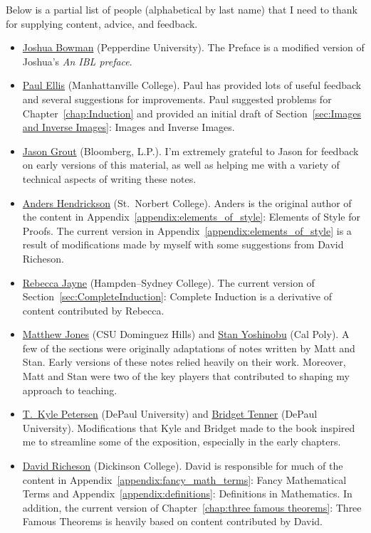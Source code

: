 \documentclass[12pt,oneside]{book}
\theoremstyle{definition}
\begin{document}
\noindent Below is a partial list of people (alphabetical by last name) that I need to thank for supplying content, advice, and feedback.
\begin{itemize}
\item \href{https://thalestriangles.blogspot.com}{Joshua Bowman} (Pepperdine University). The Preface is a modified version of Joshua's \emph{An IBL preface}.
\item \href{http://www.paulellis.org}{Paul Ellis} (Manhattanville College). Paul has provided lots of useful feedback and several suggestions for improvements. Paul suggested problems for Chapter~\ref{chap:Induction} and provided an initial draft of Section~\ref{sec:Images and Inverse Images}: Images and Inverse Images.
\item \href{http://jasongrout.org}{Jason Grout} (Bloomberg, L.P.).  I'm extremely grateful to Jason for feedback on early versions of this material, as well as helping me with a variety of technical aspects of writing these notes.
\item \href{http://home.snc.edu/andershendrickson/}{Anders Hendrickson} (St.~Norbert College). Anders is the original author of the content in Appendix~\ref{appendix:elements_of_style}: Elements of Style for Proofs. The current version in Appendix~\ref{appendix:elements_of_style} is a result of modifications made by myself with some suggestions from David Richeson.
\item \href{http://www.hsc.edu/rebecca-jayne}{Rebecca Jayne} (Hampden--Sydney College). The current version of Section~\ref{sec:CompleteInduction}: Complete Induction is a derivative of content contributed by Rebecca.
\item \href{http://www4.csudh.edu/library/info/civic-directory/f-j/matthew-g-jones}{Matthew Jones} (CSU Dominguez Hills) and \href{http://www.stanyoshinobu.com}{Stan Yoshinobu} (Cal Poly). A few of the sections were originally adaptations of notes written by Matt and Stan. Early versions of these notes relied heavily on their work. Moreover, Matt and Stan were two of the key players that contributed to shaping my approach to teaching.
\item \href{http://math.depaul.edu/tpeter21/}{T.~Kyle Petersen} (DePaul University) and \href{http://math.depaul.edu/bridget/}{Bridget Tenner} (DePaul University). Modifications that Kyle and Bridget made to the book inspired me to streamline some of the exposition, especially in the early chapters.
\item \href{http://users.dickinson.edu/~richesod/}{David Richeson} (Dickinson College). David is responsible for much of the content in Appendix~\ref{appendix:fancy_math_terms}: Fancy Mathematical Terms and Appendix~\ref{appendix:definitions}: Definitions in Mathematics. In addition, the current version of Chapter~\ref{chap:three famous theorems}: Three Famous Theorems is heavily based on content contributed by David.

\end{itemize}
\end{document}
